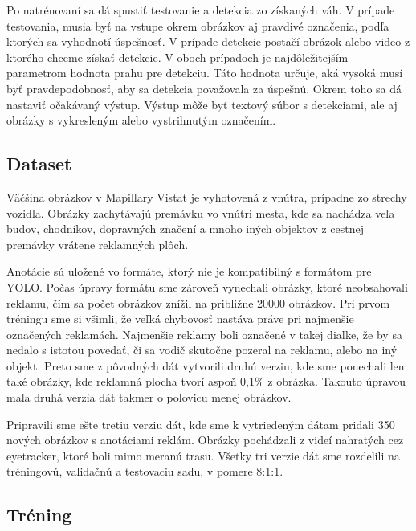 
Po natrénovaní sa dá spustiť testovanie a detekcia zo získaných váh. V prípade testovania, musia byť na vstupe okrem obrázkov aj pravdivé označenia, podľa ktorých sa vyhodnotí úspešnosť. V prípade detekcie postačí obrázok alebo video z ktorého chceme získať detekcie. V oboch prípadoch je najdôležitejším parametrom hodnota prahu pre detekciu. Táto hodnota určuje, aká vysoká musí byť pravdepodobnosť, aby sa detekcia považovala za úspešnú. Okrem toho sa dá nastaviť očakávaný výstup. Výstup môže byť textový súbor s detekciami, ale aj obrázky s vykresleným alebo vystrihnutým označením.

\subsection{Dataset}

Väčšina obrázkov v Mapillary Vistat je vyhotovená z vnútra, prípadne zo strechy vozidla. Obrázky zachytávajú premávku vo vnútri mesta, kde sa nachádza veľa budov, chodníkov, dopravných značení a mnoho iných objektov z cestnej premávky vrátene reklamných plôch.

Anotácie sú uložené vo formáte, ktorý nie je kompatibilný s formátom pre YOLO. Počas úpravy formátu sme zároveň vynechali obrázky, ktoré neobsahovali reklamu, čím sa počet obrázkov znížil na približne 20000 obrázkov. Pri prvom tréningu sme si všimli, že veľká chybovosť nastáva práve pri najmenšie označených reklamách. Najmenšie reklamy boli označené v takej diaľke, že by sa nedalo s istotou povedať, či sa vodič skutočne pozeral na reklamu, alebo na iný objekt. Preto sme z pôvodných dát vytvorili druhú verziu, kde sme ponechali len také obrázky, kde reklamná plocha tvorí aspoň 0,1\% z obrázka. Takouto úpravou mala druhá verzia dát takmer o polovicu menej obrázkov.

Pripravili sme ešte tretiu verziu dát, kde sme k vytriedeným dátam pridali 350 nových obrázkov s anotáciami reklám. Obrázky pochádzali z videí nahratých cez eyetracker, ktoré boli mimo meranú trasu. Všetky tri verzie dát sme rozdelili na tréningovú, validačnú a testovaciu sadu, v pomere 8:1:1.

\subsection{Tréning}

